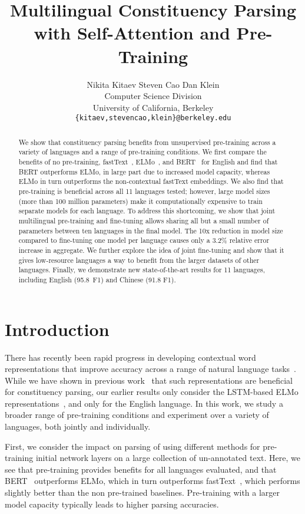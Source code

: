 \documentclass[11pt,a4paper]{article}
\title{Multilingual Constituency Parsing with Self-Attention and Pre-Training}
\author{Nikita Kitaev \qquad Steven Cao \qquad Dan Klein \\
  Computer Science Division \\
  University of California, Berkeley \\
  {\tt \{kitaev,stevencao,klein\}@berkeley.edu}}
\date{}
\begin{document}
\maketitle
\begin{abstract}
We show that constituency parsing benefits from unsupervised pre-training across a variety of languages and a range of pre-training conditions. We first compare the benefits of no pre-training, fastText~\citep{bojanowski2017enriching,mikolov2018advances}, ELMo~\citep{peters_deep_2018}, and BERT~\citep{devlin_bert:2018} for English and find that BERT outperforms ELMo, in large part due to increased model capacity, whereas ELMo in turn outperforms the non-contextual fastText embeddings. We also find that pre-training is beneficial across all 11 languages tested; however, large model sizes (more than 100 million parameters) make it computationally expensive to train separate models for each language. To address this shortcoming, we show that joint multilingual pre-training and fine-tuning allows sharing all but a small number of parameters between ten languages in the final model. The 10x reduction in model size compared to fine-tuning one model per language causes only a 3.2\% relative error increase in aggregate. We further explore the idea of joint fine-tuning and show that it gives low-resource languages a way to benefit from the larger datasets of other languages. Finally, we demonstrate new state-of-the-art results for 11 languages, including English (95.8~F1) and Chinese (91.8 F1).
\end{abstract}

\section{Introduction}
\label{sec:intro}

There has recently been rapid progress in developing contextual word representations that improve accuracy across a range of natural language tasks~\cite{peters_deep_2018,howard_2018_ulmfit,radford2018improving,devlin_bert:2018}. While we have shown in previous work~\citep{kitaev_2018_self_attentive} that such representations are beneficial for constituency parsing, our earlier results only consider the LSTM-based ELMo representations~\cite{peters_deep_2018}, and only for the English language. In this work, we study a broader range of pre-training conditions and experiment over a variety of languages, both jointly and individually.

First, we consider the impact on parsing of using
different methods for pre-training initial network layers on a large collection of un-annotated text.
Here, we see that pre-training provides benefits for all languages evaluated, and that BERT~\cite{devlin_bert:2018} outperforms ELMo, which in turn outperforms fastText~\citep{bojanowski2017enriching,mikolov2018advances}, which performs slightly better than the non pre-trained baselines. Pre-training with a larger model capacity typically leads to higher parsing accuracies.
\end{document}
